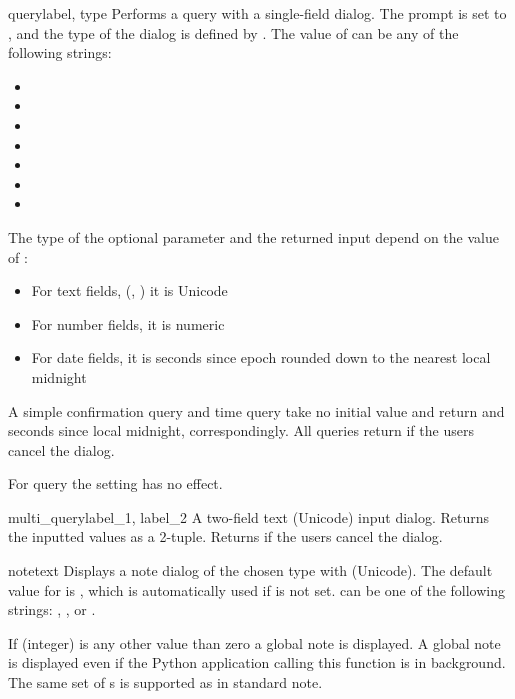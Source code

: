 \begin{funcdesc}{query}{label, type}
Performs a query with a single-field dialog. The prompt is set to 
, and the type of the dialog is defined by . The 
value of  can be any of the following strings:

\begin{itemize}
\item {}
\item {}
\item {}
\item {}
\item {}
\item {}
\item {}
\end{itemize}

The type of the optional  parameter and the 
returned input depend on the value of :

\begin{itemize}
\item For text fields, (, ) it is Unicode
\item For number fields, it is numeric
\item For date fields, it is seconds since epoch rounded down to the nearest local midnight
\end{itemize}

A simple confirmation query and time query take no initial value and return 
 and seconds since local midnight, correspondingly. All 
queries return  if the users cancel the dialog. 

For  query the  setting has no 
effect.
\end{funcdesc}


\begin{funcdesc}{multi_query}{label_1, label_2}
A two-field text (Unicode) input dialog. Returns the inputted values
as a 2-tuple. Returns  if the users cancel the dialog.
\end{funcdesc}

\begin{funcdesc}{note}{text}
Displays a note dialog of the chosen type with  
(Unicode). The default value for  is , which is 
automatically used if  is not set.  can be one of 
the following strings: , , or 
. 

If  (integer) is any other value than zero a global note is 
displayed. A global note is displayed even if the Python application calling 
this function is in background. The same set of s is supported as in 
standard note.
\end{funcdesc}

